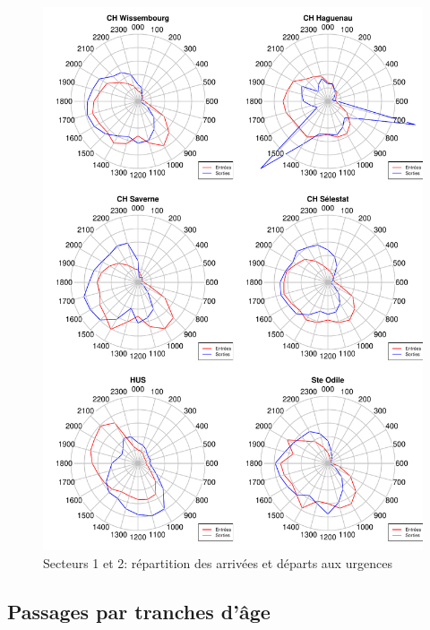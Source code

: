 \documentclass[12pt,english,french,twoside]{book}\usepackage[]{graphicx}\usepackage[]{color}
\makeatletter
\def\maxwidth{ %
  \ifdim\Gin@nat@width>\linewidth
    \linewidth
  \else
    \Gin@nat@width
  \fi
}
\newenvironment{knitrout}{}{} %
\makeatother
\begin{document}
\begin{figure}
\begin{center}
\begin{knitrout}
\color{fgcolor}
\includegraphics[width=\maxwidth]{figure/test27} 

\end{knitrout}

\end{center}
\caption{Secteurs 1 et 2: répartition des arrivées et départs aux urgences}
\label{passage:secteur12}
\end{figure}



\subsection{Passages par tranches d'âge}
\end{document}
